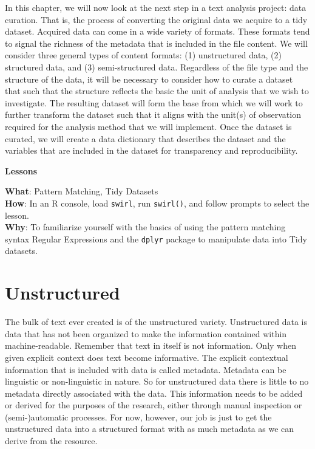 \documentclass[
  letterpaper,
]{latex/krantz}
\theoremstyle{definition}
\theoremstyle{remark}
\begin{document}
In this chapter, we will now look at the next step in a text analysis
project: data curation. That is, the process of converting the original
data we acquire to a tidy dataset. Acquired data can come in a wide
variety of formats. These formats tend to signal the richness of the
metadata that is included in the file content. We will consider three
general types of content formats: (1) unstructured data, (2) structured
data, and (3) semi-structured data. Regardless of the file type and the
structure of the data, it will be necessary to consider how to curate a
dataset that such that the structure reflects the basic the unit of
analysis that we wish to investigate. The resulting dataset will form
the base from which we will work to further transform the dataset such
that it aligns with the unit(s) of observation required for the analysis
method that we will implement. Once the dataset is curated, we will
create a data dictionary that describes the dataset and the variables
that are included in the dataset for transparency and reproducibility.

\begin{tcolorbox}[enhanced jigsaw, colframe=quarto-callout-color-frame, breakable, bottomrule=.15mm, arc=.35mm, left=2mm, opacityback=0, rightrule=.15mm, colback=white, toprule=.15mm, leftrule=.75mm]

\textbf{ Lessons}

\textbf{What}: Pattern Matching, Tidy Datasets\\
\textbf{How}: In an R console, load \texttt{swirl}, run
\texttt{swirl()}, and follow prompts to select the lesson.\\
\textbf{Why}: To familiarize yourself with the basics of using the
pattern matching syntax Regular Expressions and the \texttt{dplyr}
package to manipulate data into Tidy datasets.

\end{tcolorbox}

\section{Unstructured}\label{unstructured}

The bulk of text ever created is of the unstructured variety.
Unstructured data is data that has not been organized to make the
information contained within machine-readable. Remember that text in
itself is not information. Only when given explicit context does text
become informative. The explicit contextual information that is included
with data is called metadata. Metadata can be linguistic or
non-linguistic in nature. So for unstructured data there is little to no
metadata directly associated with the data. This information needs to be
added or derived for the purposes of the research, either through manual
inspection or (semi-)automatic processes. For now, however, our job is
just to get the unstructured data into a structured format with as much
metadata as we can derive from the resource.
\end{document}
